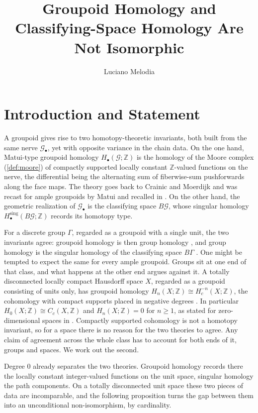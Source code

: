 \documentclass{extracta-temp-26}
\title{Groupoid Homology and Classifying-Space Homology Are Not Isomorphic}
\author{Luciano Melodia\orcidid{0000-0002-7584-7287}}
\numberwithin{equation}{section}
\theoremstyle{definition}
\theoremstyle{remark}
\newcommand{\G}{\mathcal{G}}
\newcommand{\Z}{\mathbb{Z}}
\newcommand{\Hsing}{H^{\mathrm{sing}}}
\begin{document}
\maketitle

\section{Introduction and Statement}
A groupoid gives rise to two homotopy-theoretic invariants, both built from the same nerve \(\G_\bullet\), yet with opposite variance in the chain data.
On the one hand, Matui-type groupoid homology \(H_\bullet(\G;\Z)\) is the homology of the Moore complex (\cref{def:moore}) of compactly supported locally constant \(\Z\)-valued functions on the nerve, the differential being the alternating sum of fiberwise-sum pushforwards along the face maps.
The theory goes back to Crainic and Moerdijk \cite[Section~3]{crainic2000homology} and was recast for ample groupoids by Matui \cite[Definition~3.1]{matui2012homology} and recalled in \cite[Section~4]{farsi2019ample}.
On the other hand, the geometric realization of \(\G_\bullet\) is the classifying space \(B\G\), whose singular homology \(\Hsing_\bullet(B\G;\Z)\) records its homotopy type.

For a discrete group \(\Gamma\), regarded as a groupoid with a single unit, the two invariants agree: groupoid homology is then group homology \cite[3.5(1)]{crainic2000homology}, and group homology is the singular homology of the classifying space \(B\Gamma\) \cite[Chapter~II, p.~36]{brown1994cohomology}.
One might be tempted to expect the same for every ample groupoid.
Groups sit at one end of that class, and what happens at the other end argues against it.
A totally disconnected locally compact Hausdorff space \(X\), regarded as a groupoid consisting of units only, has groupoid homology \(H_n(X;\Z)\cong H_c^{-n}(X;\Z)\), the cohomology with compact supports placed in negative degrees \cite[3.5(3)]{crainic2000homology}.
In particular \(H_0(X;\Z)\cong C_c(X,\Z)\) and \(H_n(X;\Z)=0\) for \(n\ge 1\), as stated for zero-dimensional spaces in \cite[Proposition~4.4]{farsi2019ample}.
Compactly supported cohomology is not a homotopy invariant, so for a space there is no reason for the two theories to agree.
Any claim of agreement across the whole class has to account for both ends of it, groups and spaces.
We work out the second.

Degree \(0\) already separates the two theories.
Groupoid homology records there the locally constant integer-valued functions on the unit space, singular homology the path components.
On a totally disconnected unit space these two pieces of data are incomparable, and the following proposition turns the gap between them into an unconditional non-isomorphism, by cardinality.
\end{document}

